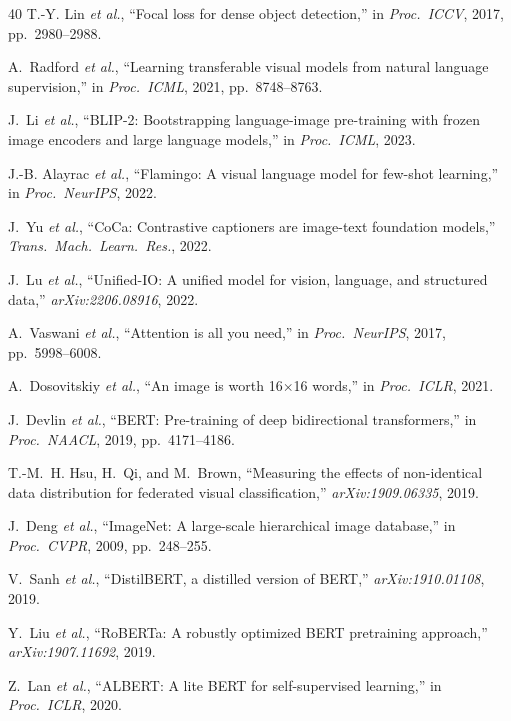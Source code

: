 \documentclass[conference]{IEEEtran}
\begin{document}
\begin{thebibliography}{40}
T.-Y. Lin \emph{et al.},
``Focal loss for dense object detection,''
in \emph{Proc.\ ICCV}, 2017, pp.\ 2980--2988.

A.~Radford \emph{et al.},
``Learning transferable visual models from natural language supervision,''
in \emph{Proc.\ ICML}, 2021, pp.\ 8748--8763.

J.~Li \emph{et al.},
``BLIP-2: Bootstrapping language-image pre-training with frozen image
encoders and large language models,''
in \emph{Proc.\ ICML}, 2023.

J.-B. Alayrac \emph{et al.},
``Flamingo: A visual language model for few-shot learning,''
in \emph{Proc.\ NeurIPS}, 2022.

J.~Yu \emph{et al.},
``CoCa: Contrastive captioners are image-text foundation models,''
\emph{Trans.\ Mach.\ Learn.\ Res.}, 2022.

J.~Lu \emph{et al.},
``Unified-IO: A unified model for vision, language, and structured data,''
\emph{arXiv:2206.08916}, 2022.

A.~Vaswani \emph{et al.},
``Attention is all you need,''
in \emph{Proc.\ NeurIPS}, 2017, pp.\ 5998--6008.

A.~Dosovitskiy \emph{et al.},
``An image is worth 16$\times$16 words,''
in \emph{Proc.\ ICLR}, 2021.

J.~Devlin \emph{et al.},
``BERT: Pre-training of deep bidirectional transformers,''
in \emph{Proc.\ NAACL}, 2019, pp.\ 4171--4186.

T.-M.~H. Hsu, H.~Qi, and M.~Brown,
``Measuring the effects of non-identical data distribution for federated
visual classification,''
\emph{arXiv:1909.06335}, 2019.

J.~Deng \emph{et al.},
``ImageNet: A large-scale hierarchical image database,''
in \emph{Proc.\ CVPR}, 2009, pp.\ 248--255.

V.~Sanh \emph{et al.},
``DistilBERT, a distilled version of BERT,''
\emph{arXiv:1910.01108}, 2019.

Y.~Liu \emph{et al.},
``RoBERTa: A robustly optimized BERT pretraining approach,''
\emph{arXiv:1907.11692}, 2019.

Z.~Lan \emph{et al.},
``ALBERT: A lite BERT for self-supervised learning,''
in \emph{Proc.\ ICLR}, 2020.


\end{thebibliography}
\end{document}
